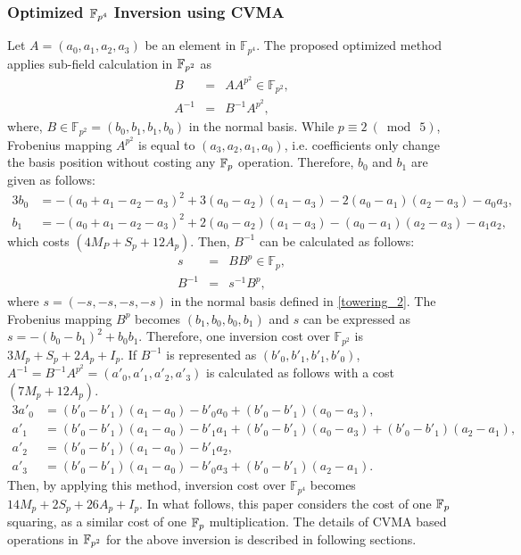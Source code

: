 \subsubsection{Optimized  $\mathbb{F}_{p^4}$ Inversion using CVMA}
Let $A=(a_0,a_1,a_2,a_3)$ be an element in $\mathbb{F}_{p^4}$.
The proposed optimized method applies sub-field calculation in $\mathbb{F}_{p^2}$ as 
\begin{eqnarray}
B&=&AA^{p^2} \in \mathbb{F}_{p^2}, \nonumber \\
A^{-1}&=&B^{-1}A^{p^2}, \nonumber
\end{eqnarray}
where, $B \in \mathbb{F}_{p^2} = (b_0,b_1,b_1,b_0)$ in the normal basis.
While $p \equiv 2~(\bmod~5)$,  Frobenius mapping $A^{p^2}$ is equal to $(a_3,a_2,a_1,a_0)$, i.e. coefficients only change the basis position without costing any ${\mathbb{F}}_{p}$ operation.
Therefore, $b_0$ and $b_1$ are given as follows: 
\begin{alignat}{3}
b_0 &=-(a_0+a_1-a_2-a_3)^2+3(a_0-a_2)(a_1-a_3)-2(a_0-a_1)(a_2-a_3)-a_0a_3, \nonumber \\
b_1 &=-(a_0+a_1-a_2-a_3)^2+2(a_0-a_2)(a_1-a_3) -(a_0-a_1)(a_2-a_3)-a_1a_2, \nonumber
\end{alignat}
which costs $(4M_P+S_p+12A_p)$.
Then, $B^{-1}$ can be calculated as follows:
\begin{eqnarray}
s&=&BB^{p} \in \mathbb{F}_p, \nonumber \\
B^{-1}&=&s^{-1}B^{p}, \nonumber
\end{eqnarray}
where $s = (-s,-s,-s,-s)$ in the normal basis defined in \eqref{towering_2}.
The Frobenius mapping $B^{p}$ becomes $(b_1,b_0,b_0,b_1)$ and $s$ can be expressed as $s=-(b_0-b_1)^2+b_0b_1$.
Therefore, one inversion cost over $\mathbb{F}_{p^2}$ is $3M_p+S_p+2A_p+I_p$.
If $B^{-1}$ is represented as $(b'_0,b'_1,b'_1,b'_0)$, $A^{-1}=B^{-1}A^{p^2}=(a'_0,a'_1,a'_2,a'_3)$ is calculated as follows with a cost $(7M_p+12A_p)$.
\begin{alignat}{3}
a'_0 &= (b'_0-b'_1)(a_1-a_0)-b'_0a_0+(b'_0-b'_1)(a_0-a_3), \nonumber \\
a'_1 &=(b'_0-b'_1)(a_1-a_0)-b'_1a_1+(b'_0-b'_1)(a_0-a_3)+(b'_0-b'_1)(a_2-a_1), \nonumber \\
a'_2 &= (b'_0-b'_1)(a_1-a_0)-b'_1a_2, \nonumber \\
a'_3 &=(b'_0-b'_1)(a_1-a_0)-b'_0a_3+(b'_0-b'_1)(a_2-a_1). \nonumber
\end{alignat}
Then, by applying this method, inversion cost over $\mathbb{F}_{p^4}$ becomes $14M_p+2S_p+26A_p+I_p$. 
In what follows, this paper considers the cost of one $\mathbb{F}_p$ squaring, as a similar cost of one $\mathbb{F}_p$ multiplication.
The details of CVMA based operations in $\mathbb{F}_{p^2}$ for the above inversion is described in following sections.

